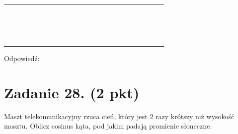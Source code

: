 \documentclass[10pt]{article}
\begin{document}
\begin{center}
\begin{tabular}{|c|c|c|c|c|c|c|c|c|c|c|c|c|c|c|c|c|c|c|c|c|c|c|}
\hline
 &  &  &  &  &  &  &  &  &  &  &  &  &  &  &  &  &  &  &  &  &  &  \\
\hline
 &  &  &  &  &  &  &  &  &  &  &  &  &  &  &  &  &  &  &  &  &  &  \\
\hline
 &  &  &  &  &  &  &  &  &  &  &  &  &  &  &  &  &  &  &  &  &  &  \\
\hline
 &  &  &  &  &  &  &  &  &  &  &  &  &  &  &  &  &  &  &  &  &  &  \\
\hline
 &  &  &  &  &  &  &  &  &  &  &  &  &  &  &  &  &  &  &  &  &  &  \\
\hline
 &  &  &  &  &  &  &  &  &  &  &  &  &  &  &  &  &  &  &  &  &  &  \\
\hline
 &  &  &  &  &  &  &  &  &  &  &  &  &  &  &  &  &  &  &  &  &  &  \\
\hline
 &  &  &  &  &  &  &  &  &  &  &  &  &  &  &  &  &  &  &  &  &  &  \\
\hline
 &  &  &  &  &  &  &  &  &  &  &  &  &  &  &  &  &  &  &  &  &  &  \\
\hline
 &  &  &  &  &  &  &  &  &  &  &  &  &  &  &  &  &  &  &  &  &  &  \\
\hline
 &  &  &  &  &  &  &  &  &  &  &  &  &  &  &  &  &  &  &  &  &  &  \\
\hline
 &  &  &  &  &  &  &  &  &  &  &  &  &  &  &  &  &  &  &  &  &  &  \\
\hline
 &  &  &  &  &  &  &  &  &  &  &  &  &  &  &  &  &  &  &  &  &  &  \\
\hline
 &  &  &  &  &  &  &  &  &  &  &  &  &  &  &  &  &  &  &  &  &  &  \\
\hline
 &  &  &  &  &  &  &  &  &  &  &  &  &  &  &  &  &  &  &  &  &  &  \\
\hline
 &  &  &  &  &  &  &  &  &  &  &  &  &  &  &  &  &  &  &  &  &  &  \\
\hline
 &  &  &  &  &  &  &  &  &  &  &  &  &  &  &  &  &  &  &  &  &  &  \\
\hline
\end{tabular}
\end{center}

Odpowiedź: \(\qquad\)

\section*{Zadanie 28. (2 pkt)}
Maszt telekomunikacyjny rzuca cień, który jest 2 razy krótszy niż wysokość masztu. Oblicz cosinus kąta, pod jakim padają promienie słoneczne.
\end{document}
